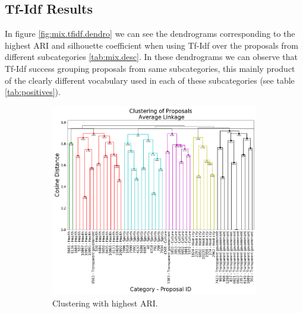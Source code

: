\subsection{Tf-Idf Results}
In figure \ref{fig:mix.tfidf.dendro} we can see the dendrograms corresponding to the highest ARI and silhouette coefficient when using Tf-Idf over the proposals from different subcategories \ref{tab:mix.desc}. In these dendrograms we can observe that Tf-Idf success grouping proposals from same subcategories, this mainly product of the clearly different vocabulary used in each of these subcategories (see table \ref{tab:positives}).   
\begin{figure}[!htpb]
  \centering
  \begin{subfigure}[b]{0.55\textwidth}  
  \centering 
  \includegraphics[width=\textwidth]{tfidf/BEST_ARI_MIX.png}
  \caption[]%
  {{\small Clustering with highest ARI.}}    
  \label{fig:mix.tfidf.ari.nmi}
  \end{subfigure}
  \begin{subfigure}[b]{0.55\textwidth}   
  \hfill
  \centering 

\end{subfigure}
\end{figure}
